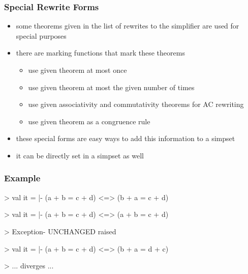 \begin{frame}
\frametitle{Special Rewrite Forms}

\begin{itemize}
\item some theorems given in the list of rewrites to the simplifier are used for special purposes
\item there are marking functions that mark these theorems
\begin{itemize}
\item {} use given theorem at most once
\item {} use given theorem at most the given number of times
\item {} use given associativity and commutativity theorems for AC rewriting
\item {} use given theorem as a congruence rule 
\end{itemize}
\item these special forms are easy ways to add this information to a simpset
\item it can be directly set in a simpset as well
\end{itemize}

\end{frame}


\begin{frame}[fragile]
\frametitle{Example }

\begin{semiverbatim}\scriptsize
> 
val it = |- (a + b = c + d) <=> (b + a = c + d)

> 
val it = |- (a + b = c + d) <=> (a + b = c + d)

> 
Exception- UNCHANGED raised

> 
val it = |- (a + b = c + d) <=> (b + a = d + c)

> 
... diverges ...
\end{semiverbatim}

\end{frame}


